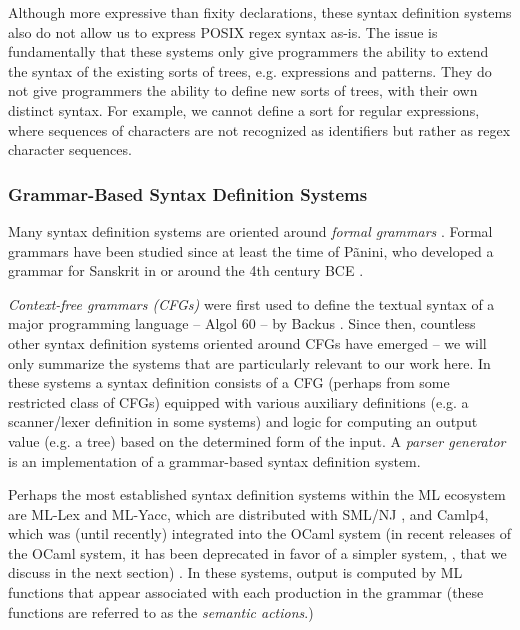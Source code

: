 Although more expressive than fixity declarations, these syntax definition systems also do not allow us to express POSIX regex syntax as-is. The issue is fundamentally that these systems only give programmers the ability to extend the syntax of the existing sorts of trees, e.g. expressions and patterns. They do not give programmers the ability to define new sorts of trees, with their own distinct syntax. For example, we cannot define a sort for regular expressions, where sequences of characters are not recognized as identifiers but rather as regex character sequences. 

\subsubsection{Grammar-Based Syntax Definition Systems}
Many syntax definition systems are oriented around \emph{formal grammars} \cite{hopcroft1979introduction}. Formal grammars have been studied since at least the time of P\~anini, who developed a grammar for Sanskrit in or around the 4th century BCE \cite{Ingerman:1967:LFS:363162.363165}. 

\emph{Context-free grammars (CFGs)} were first used to define the textual syntax of a major programming language -- Algol 60 -- by Backus \cite{naur1963revised}. Since then, countless other syntax definition systems oriented around CFGs have emerged -- we will only summarize the systems that are particularly relevant to our work here. In these systems a syntax definition consists of a CFG (perhaps from some restricted class of CFGs) equipped with various auxiliary definitions (e.g. a scanner/lexer definition in some systems) and logic for computing an output value (e.g. a tree) based on the determined form of the input. A \emph{parser generator} is an implementation of a grammar-based syntax definition system.


Perhaps the most established syntax definition systems within the ML ecosystem are ML-Lex  and ML-Yacc, which are distributed with SML/NJ \cite{TarditiDR:mly}, and Camlp4, which was (until recently)  integrated into  the OCaml system (in recent releases of the OCaml system, it has been deprecated in favor of a simpler system, , that we discuss in the next section) \cite{ocaml-manual}. In these systems, output is  computed by ML functions that appear associated with each production in the grammar (these functions are referred to as the \emph{semantic actions}.) 

